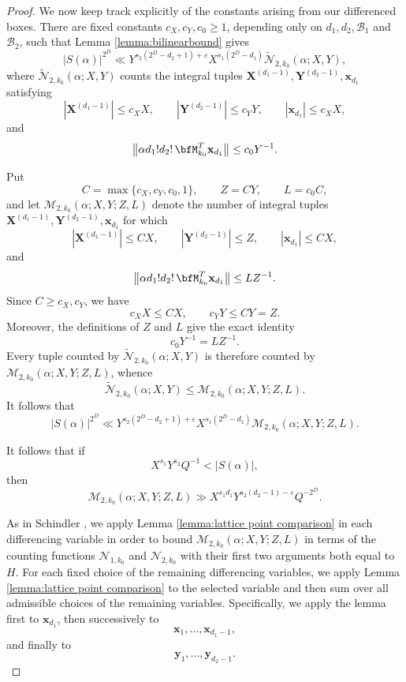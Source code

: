 \documentclass[12pt,reqno]{amsart}
\theoremstyle{definition}
\theoremstyle{remark}
\numberwithin{equation}{section}
\def\bfx{{\mathbf x}}
\def\bfy{{\mathbf y}}
\def\bfX{{\mathbf X}}
\def\bfY{{\mathbf Y}}
\def\a{{\alpha}} \def\bfalp{{\boldsymbol \alpha}} \def\atil{{\widetilde \alpha}}
\def\eps{\varepsilon}
\begin{document}
\begin{proof}
    We now keep track explicitly of the constants arising from our differenced boxes. There are fixed constants $c_X,c_Y,c_0\geq 1$,
    depending only on $d_1,d_2,\mathcal B_1$ and $\mathcal B_2$, such that
    Lemma \ref{lemma:bilinearbound} gives
    \[
        |S(\a)|^{2^{D}}
        \ll
        Y^{s_2(2^D-d_2+1)+\eps}X^{s_1(2^D-d_1)}
        \widetilde{\mathcal N}_{2,k_0}(\a;X,Y),
    \]
    where $\widetilde{\mathcal N}_{2,k_0}(\a;X,Y)$ counts the integral tuples
    $\bfX^{(d_1-1)},\bfY^{(d_2-1)},\bfx_{d_1}$ satisfying
    \[
        |\bfX^{(d_1-1)}|\leq c_XX,
        \qquad
        |\bfY^{(d_2-1)}|\leq c_YY,
        \qquad
        |\bfx_{d_1}|\leq c_XX,
    \]
    and
    \[
        \bigl\|
        \a d_1!d_2!\,\bfM_{k_0}^{T}\bfx_{d_1}
        \bigr\|
        \leq c_0Y^{-1}.
    \]

    Put
    \[
        C=\max\{c_X,c_Y,c_0,1\},
        \qquad Z=CY,
        \qquad L=c_0C,
    \]
    and let $\mathcal M_{2,k_0}(\a;X,Y;Z,L)$ denote the number of integral
    tuples $\bfX^{(d_1-1)},\bfY^{(d_2-1)},\bfx_{d_1}$ for which
    \[
        |\bfX^{(d_1-1)}|\leq CX,
        \qquad
        |\bfY^{(d_2-1)}|\leq Z,
        \qquad
        |\bfx_{d_1}|\leq CX,
    \]
    and
    \[
        \bigl\|
        \a d_1!d_2!\,\bfM_{k_0}^{T}\bfx_{d_1}
        \bigr\|
        \leq LZ^{-1}.
    \]
    Since $C\geq c_X,c_Y$, we have
    \[
        c_XX\leq CX,
        \qquad
        c_YY\leq CY=Z.
    \]
    Moreover, the definitions of $Z$ and $L$ give the exact identity
    \[
        c_0Y^{-1}=LZ^{-1}.
    \]
    Every tuple counted by
    $\widetilde{\mathcal N}_{2,k_0}(\a;X,Y)$ is therefore counted by
    $\mathcal M_{2,k_0}(\a;X,Y;Z,L)$, whence
    \[
        \widetilde{\mathcal N}_{2,k_0}(\a;X,Y)
        \leq
        \mathcal M_{2,k_0}(\a;X,Y;Z,L).
    \]
    It follows that
    \[
        |S(\a)|^{2^{D}}
        \ll
        Y^{s_2(2^D-d_2+1)+\eps}X^{s_1(2^D-d_1)}
        \mathcal M_{2,k_0}(\a;X,Y;Z,L).
    \]

    It follows that if
    \[
        X^{s_1}Y^{s_2}Q^{-1}<|S(\a)|,
    \]
    then
    \[
        \mathcal M_{2,k_0}(\a;X,Y;Z,L)
        \gg
        X^{s_1d_1}Y^{s_2(d_2-1)-\eps}Q^{-2^D}.
    \]

    As in Schindler \cite[\S 4]{Schindler2014}, we apply Lemma
    \ref{lemma:lattice point comparison} in each differencing variable in order to
    bound $\mathcal M_{2,k_0}(\a;X,Y;Z,L)$ in terms of
    the counting functions $\mathcal N_{1,k_0}$ and $\mathcal N_{2,k_0}$
    with their first two arguments both equal to $H$. For each fixed choice 
    of the remaining differencing variables, we apply Lemma \ref{lemma:lattice point comparison} 
    to the selected variable and then sum over all admissible choices of the remaining variables. 
    Specifically, we apply the lemma first to $\bfx_{d_1}$, then successively to
    \[
        \bfx_1,\ldots,\bfx_{d_1-1},
    \]
    and finally to
    \[
        \bfy_1,\ldots,\bfy_{d_2-1}.
    \]
    


\end{proof}
\end{document}
